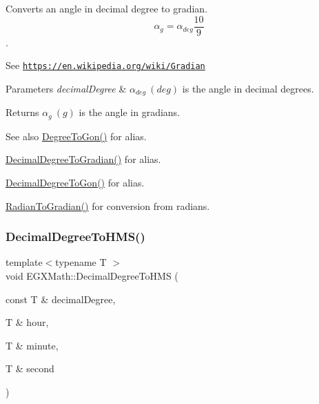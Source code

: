 Converts an angle in decimal degree to gradian. \[\alpha_{g}=\alpha_{deg}\frac{10}{9}\]. 

See \href{https://en.wikipedia.org/wiki/Gradian}{\tt https\+://en.\+wikipedia.\+org/wiki/\+Gradian} 
\begin{DoxyParams}{Parameters}
{\em decimal\+Degree} & $\alpha_{deg}\ (deg)$ is the angle in decimal degrees. \\
\hline
\end{DoxyParams}
\begin{DoxyReturn}{Returns}
$\alpha_{g}\ (g)$ is the angle in gradians. 
\end{DoxyReturn}
\begin{DoxySeeAlso}{See also}
\mbox{\hyperlink{group___e_g_x_math-_angle_conversions-_degree_ga87c3fab0867021e5d2501197b4db6194}{Degree\+To\+Gon()}} for alias. 

\mbox{\hyperlink{group___e_g_x_math-_angle_conversions-_decimal_degree_ga3ac6f1ceb36a4938cdf3b55554734c99}{Decimal\+Degree\+To\+Gradian()}} for alias. 

\mbox{\hyperlink{group___e_g_x_math-_angle_conversions-_decimal_degree_gaeb333a1ad0aeb913c025fbd1be85fcb3}{Decimal\+Degree\+To\+Gon()}} for alias. 

\mbox{\hyperlink{group___e_g_x_math-_angle_conversions-_radian_ga3c1607eae50cbf0186c42485bb3878d5}{Radian\+To\+Gradian()}} for conversion from radians. 
\end{DoxySeeAlso}
\mbox{\label{group___e_g_x_math-_angle_conversions-_decimal_degree_ga981b48f16766590641360ca98dfa7b8c}} 
\subsubsection{\texorpdfstring{Decimal\+Degree\+To\+H\+M\+S()}{DecimalDegreeToHMS()}}
{\footnotesize\ttfamily template$<$typename T $>$ \\
void E\+G\+X\+Math\+::\+Decimal\+Degree\+To\+H\+MS (\begin{DoxyParamCaption}\item[{const T \&}]{decimal\+Degree,  }\item[{T \&}]{hour,  }\item[{T \&}]{minute,  }\item[{T \&}]{second }\end{DoxyParamCaption})}



